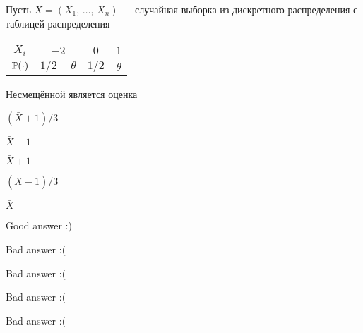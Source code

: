 
\begin{question}
Пусть \(X = (X_1, \, \ldots, \, X_n)\) --- случайная выборка из
дискретного распределения с таблицей распределения

\vspace{5mm}
\begin{tabular}{cccc}
\toprule
$X_i$  & $-2$    & $0$      & $1$  \\
\midrule
$\P(\cdot)$        & $1/2 - \theta$      & $1/2$    & $\theta$  \\
\bottomrule
\end{tabular}
\vspace{5mm}

Несмещённой является оценка
\begin{answerlist}
  \item \((\bar{X} + 1) / 3\)
  \item \(\bar{X} - 1\)
  \item \(\bar{X} + 1\)
  \item \((\bar{X} - 1) / 3\)
  \item \(\bar{X}\)
\end{answerlist}
\end{question}

\begin{solution}
\begin{answerlist}
  \item Good answer :)
  \item Bad answer :(
  \item Bad answer :(
  \item Bad answer :(
  \item Bad answer :(
\end{answerlist}
\end{solution}

